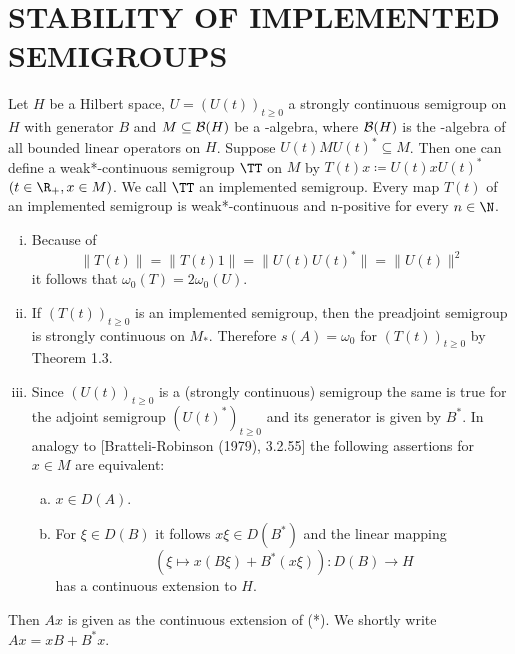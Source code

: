 \section{STABILITY OF IMPLEMENTED SEMIGROUPS}

Let $H$ be a Hilbert space, $U = (U(t))_{t \geq 0}$ a strongly continuous semigroup on $H$ with generator $B$ and $M \subseteq \mathcal{B}(H)$ be a \WA-algebra, where $\mathcal{B}(H)$ is the \WA-algebra of all bounded linear operators on $H$.
Suppose $U(t)MU(t)^{*} \subseteq M$.
Then one can define a weak*-continuous semigroup $\TT$ on $M$ by $T(t)x \coloneqq U(t)xU(t)^{*}$ $(t \in \R_{+}, x \in M)$.
We call $\TT$ an implemented semigroup.
Every map $T(t)$ of an implemented semigroup is weak*-continuous and n-positive for every $n \in \N$.

\begin{remarks}\label{rem:d4-2.1}
\begin{enumerate}[(i)]
\item
Because of
\[
\|T(t)\| = \|T(t)1\| = \|U(t)U(t)^{*}\| = \|U(t)\|^2
\]
it follows that $\omega_{0}(T) = 2\omega_{0}(U)$.

\item
If $(T(t))_{t \geq 0}$ is an implemented semigroup, then the preadjoint semigroup is strongly continuous on $M_{*}$.
Therefore $s(A) = \omega_{0}$ for $(T(t))_{t \geq 0}$ by Theorem 1.3.

\item
Since $(U(t))_{t \geq 0}$ is a (strongly continuous) semigroup the same is true for the adjoint semigroup $(U(t)^{*})_{t \geq 0}$ and its generator is given by $B^{*}$.
In analogy to [Bratteli-Robinson (1979), 3.2.55] the following assertions for $x \in M$ are equivalent:

\begin{enumerate}[(a)]
\item
$x \in D(A)$.

\item
For $\xi \in D(B)$ it follows $x\xi \in D(B^{*})$ and the linear mapping
\begin{equation}
	(\xi \mapsto x(B\xi)+B^{*}(x\xi)): D(B) \to H \tag{*}
\end{equation}
has a continuous extension to $H$.
\end{enumerate}
\end{enumerate}
\end{remarks}

\newpage


Then $Ax$ is given as the continuous extension of (*).
We shortly write $Ax = xB + B^{*}x$.

